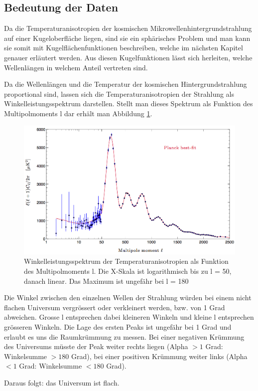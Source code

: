 \subsection{Bedeutung der Daten}
Da die Temperaturanisotropien der kosmischen Mikrowellenhintergrundstrahlung auf einer
Kugeloberfläche liegen, sind sie ein sphärisches Problem und man kann sie somit mit 
Kugelflächenfunktionen beschreiben, welche im nächsten Kapitel genauer erläutert werden.
Aus diesen Kugelfunktionen lässt sich herleiten, welche Wellenlängen in welchem Anteil vertreten sind.

Da die Wellenlängen und die Temperatur der kosmischen Hintergrundstrahlung proportional sind, lassen sich die Temperaturanisotropien der Strahlung als Winkelleistungsspektrum darstellen.
Stellt man dieses Spektrum als Funktion des Multipolmoments l dar erhält man Abbildung \ref{fig:planck_spectrum}.

\begin{figure}
	\includegraphics[width=\linewidth]{cmb/images/mission_spectrum.png}
	\caption{Winkelleistungsspektrum der Temperaturanisotropien als Funktion des Multipolmoments l.
		Die X-Skala ist logarithmisch bis zu l = 50, danach linear. Das Maximum ist ungefähr bei l = 180}
	\label{fig:planck_spectrum}
\end{figure}

Die Winkel zwischen den einzelnen Wellen der Strahlung würden bei einem nicht flachen Universum
vergrössert oder verkleinert werden, bzw. von 1 Grad abweichen. %
Grosse l entsprechen dabei kleineren Winkeln und kleine l entsprechen grösseren Winkeln.
Die Lage des ersten Peaks ist ungefähr bei 1 Grad und erlaubt es uns die Raumkrümmung zu messen.
Bei einer negativen Krümmung des Universums müsste der Peak weiter rechts liegen (Alpha $> 1$ Grad: Winkelsumme $> 180$ Grad),
bei einer positiven Krümmung weiter links (Alpha $< 1$ Grad: Winkelsumme $< 180$  Grad).

Daraus folgt: das Universum ist flach.


